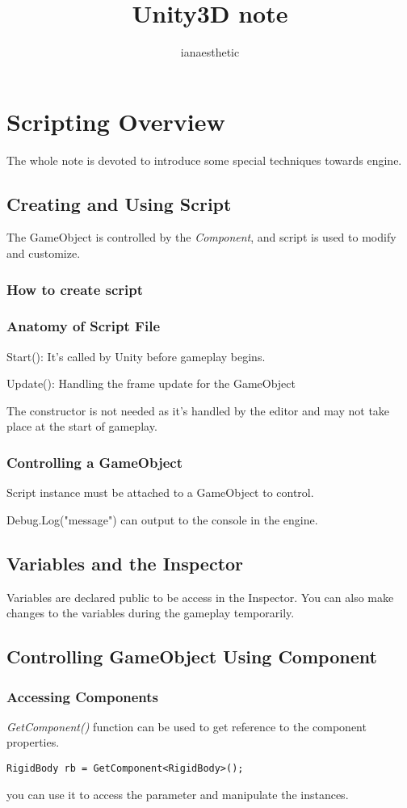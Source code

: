 \documentclass[10pt, a4paper]{article}
\author{ianaesthetic}
\title{Unity3D note}
\begin{document}
    \section{Scripting Overview}
        The whole note is devoted to introduce some special techniques towards engine. 
        \subsection{Creating and Using Script}
            The GameObject is controlled by the \emph{Component}, and script is used to modify and customize. 
            \subsubsection{How to create script}
            \subsubsection{Anatomy of Script File}
                Start(): It's called by Unity before gameplay begins.
                
                Update(): Handling the frame update for the GameObject
                
                The constructor is not needed as it's handled by the editor and may not take place at the start of gameplay. 

            \subsubsection{Controlling a GameObject}
                Script instance must be attached to a GameObject to control. 

                Debug.Log("message") can output to the console in the engine. 
            
        \subsection{Variables and the Inspector}
            Variables are declared public to be access in the Inspector. You can also make changes to the variables during the gameplay temporarily. 
        \subsection{Controlling GameObject Using Component}
            \subsubsection{Accessing Components}
                \emph{GetComponent()} function can be used to get reference to the component properties. 
\begin{lstlisting}
RigidBody rb = GetComponent<RigidBody>(); 
\end{lstlisting}
                you can use it to access the parameter and manipulate the instances.
\end{document}
